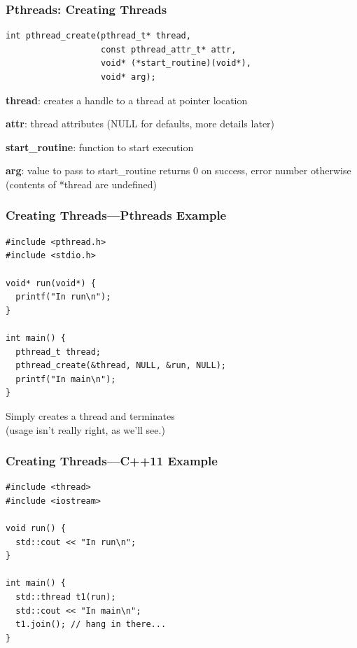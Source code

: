 \begin{frame}[fragile]
  \frametitle{Pthreads: Creating Threads}


  \begin{lstlisting}
int pthread_create(pthread_t* thread, 
                   const pthread_attr_t* attr,
                   void* (*start_routine)(void*),
                   void* arg);
  \end{lstlisting}
  \vfill
  {\bf thread}: creates a handle to a thread at pointer location

  {\bf attr}: thread attributes (NULL for defaults, more details later)

  {\bf start\_routine}: function to start execution

  {\bf arg}: value to pass to start\_routine
  \vfill
  returns 0 on success, error number otherwise\\(contents of *thread are
  undefined)

\end{frame}

\begin{frame}[fragile]
  \frametitle{Creating Threads---Pthreads Example}


\begin{lstlisting}
#include <pthread.h>
#include <stdio.h>

void* run(void*) {
  printf("In run\n");
}

int main() {
  pthread_t thread;
  pthread_create(&thread, NULL, &run, NULL);
  printf("In main\n");
}
\end{lstlisting}
  \vfill
  Simply creates a thread and terminates\\(usage isn't really right, as we'll
  see.)

\end{frame}

\begin{frame}[fragile]
  \frametitle{Creating Threads---C++11 Example}


\begin{lstlisting}
#include <thread>
#include <iostream>

void run() {
  std::cout << "In run\n";
}

int main() {
  std::thread t1(run);
  std::cout << "In main\n";
  t1.join(); // hang in there...
}
\end{lstlisting}

\end{frame}


